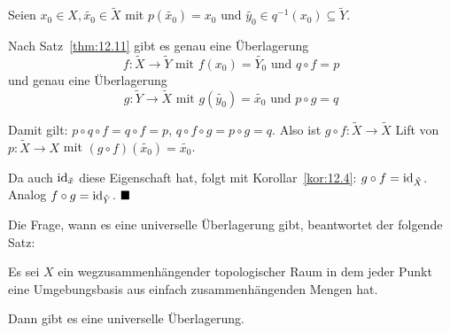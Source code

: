 \begin{beweis}
    Seien $x_0 \in X, \tilde{x_0} \in \tilde{X}$ mit 
    $p(\tilde{x_0}) = x_0$ und 
    $\tilde{y_0} \in q^{-1}(x_0) \subseteq \tilde{Y}$.

    Nach Satz~\ref{thm:12.11} gibt es genau eine Überlagerung
    \[f:\tilde{X} \rightarrow \tilde{Y} \text{ mit } f(x_0) = \tilde{Y_0} \text{ und } q \circ f = p\]
    und genau eine Überlagerung
    \[g: \tilde{Y} \rightarrow \tilde{X} \text{ mit } g(\tilde{y_0}) = \tilde{x_0} \text{ und } p \circ g = q\]

    Damit gilt: $p \circ q \circ f = q \circ f = p$, $q \circ f \circ g = p \circ g = q$.
    Also ist $g \circ f: \tilde{X} \rightarrow \tilde{X}$ Lift von 
    $p:\tilde{X} \rightarrow X$ mit $(g \circ f) (\tilde{x_0}) = \tilde{x_0}$.

    Da auch $\textnormal{id}_{\tilde{x}}$ diese Eigenschaft hat, folgt mit
    Korollar~\ref{kor:12.4}: $g \circ f = \textnormal{id}_{\tilde{X}}$.
    Analog $f \circ g = \textnormal{id}_{\tilde{Y}}$. $\qed$
\end{beweis}

Die Frage, wann es eine universelle Überlagerung gibt, beantwortet
der folgende Satz:

\begin{satz}%
    Es sei $X$ ein wegzusammenhängender topologischer Raum in dem
    jeder Punkt eine Umgebungsbasis aus einfach zusammenhängenden
    Mengen hat.

    Dann gibt es eine universelle Überlagerung.
\end{satz}

